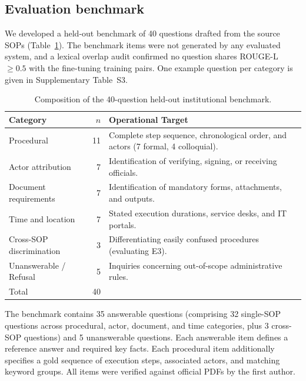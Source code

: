 \documentclass[preprint,10pt]{elsarticle}
\begin{document}
\subsection{Evaluation benchmark}
We developed a held-out benchmark of 40 questions drafted from the source SOPs (Table~\ref{tab:bench}). The benchmark items were not generated by any evaluated system, and a lexical overlap audit confirmed no question shares ROUGE-L $\geq 0.5$ with the fine-tuning training pairs. One example question per category is given in Supplementary Table~S3.

\begin{table}[!htbp]
\centering
\caption{Composition of the 40-question held-out institutional benchmark.}
\label{tab:bench}
\small
\setlength{\tabcolsep}{4pt}
\begin{tabularx}{\textwidth}{lr>{\raggedright\arraybackslash}X}
\toprule
Category & $n$ & Operational Target \\
\midrule
Procedural & 11 & Complete step sequence, chronological order, and actors (7 formal, 4 colloquial). \\
Actor attribution & 7 & Identification of verifying, signing, or receiving officials. \\
Document requirements & 7 & Identification of mandatory forms, attachments, and outputs. \\
Time and location & 7 & Stated execution durations, service desks, and IT portals. \\
Cross-SOP discrimination & 3 & Differentiating easily confused procedures (evaluating E3). \\
Unanswerable / Refusal & 5 & Inquiries concerning out-of-scope administrative rules. \\
\midrule
Total & 40 & \\
\bottomrule
\end{tabularx}
\end{table}

The benchmark contains 35 answerable questions (comprising 32 single-SOP questions across procedural, actor, document, and time categories, plus 3 cross-SOP questions) and 5 unanswerable questions. Each answerable item defines a reference answer and required key facts. Each procedural item additionally specifies a gold sequence of execution steps, associated actors, and matching keyword groups. All items were verified against official PDFs by the first author.
\end{document}
